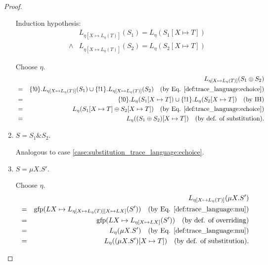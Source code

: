 \documentclass{llncs}
\newcommand*{\gfp}{\mathrm{gfp}}
\newcommand*{\union}{\cup}
\newcommand*{\send}{\mathord{!}}
\newcommand*{\echoice}{\oplus}
\newcommand*{\ichoice}{\mathop{\&}}
\renewcommand*{\|}{\;|\;}
\begin{document}
\begin{proof}
\begin{enumerate}
      Induction hypothesis:
      \begin{eqnarray*}
        &&      L_{\eta[X \mapsto L_\eta(T)]}(S_1) = L_\eta(S_1[X \mapsto T]) \\
        &\land& L_{\eta[X \mapsto L_\eta(T)]}(S_2) = L_\eta(S_2[X \mapsto T])
      \end{eqnarray*}

      Choose $\eta$.
      \begin{eqnarray*}
        &&  L_{\eta[X \mapsto L_\eta(T)]}(S_1 \echoice S_2) \\
        &=& \{\send 0\} . L_{\eta[X \mapsto L_\eta(T)]}(S_1) \union \{\send 1\} . L_{\eta[X \mapsto L_\eta(T)]}(S_2)
            \quad \text{(by Eq. \ref{def:trace_language:echoice})} \\
        &=& \{\send 0\} . L_\eta(S_1[X \mapsto T]) \union \{\send 1\} . L_\eta(S_2[X \mapsto T])
            \quad \text{(by IH)} \\
        &=& L_\eta(S_1[X \mapsto T] \echoice S_2[X \mapsto T])
            \quad \text{(by Eq. \ref{def:trace_language:echoice})} \\
        &=& L_\eta((S_1 \echoice S_2)[X \mapsto T])
            \quad \text{(by def. of substitution)}.
      \end{eqnarray*}

    \item
      \label{case:substitution_trace_language:ichoice}
      $S = S_1 \ichoice S_2$.

      Analogous to case \ref{case:substitution_trace_language:echoice}.

    \item
      \label{case:substitution_trace_language:mu1}
      $S = \mu X.S'$.

      Choose $\eta$.
      \begin{eqnarray*}
        &&  L_{\eta[X \mapsto L_\eta(T)]}(\mu X.S') \\
        &=& \gfp(LX \mapsto L_{\eta[X \mapsto L_\eta(T)][X \mapsto LX]}(S'))
            \quad \text{(by Eq. \ref{def:trace_language:mu})} \\
        &=& \gfp(LX \mapsto L_{\eta[X \mapsto LX]}(S'))
            \quad \text{(by def. of overriding)} \\
        &=& L_\eta(\mu X.S')
            \quad \text{(by Eq. \ref{def:trace_language:mu})} \\
        &=& L_\eta((\mu X.S')[X \mapsto T])
            \quad \text{(by def. of substitution)}. \\
      \end{eqnarray*}


\end{enumerate}
\end{proof}
\end{document}
